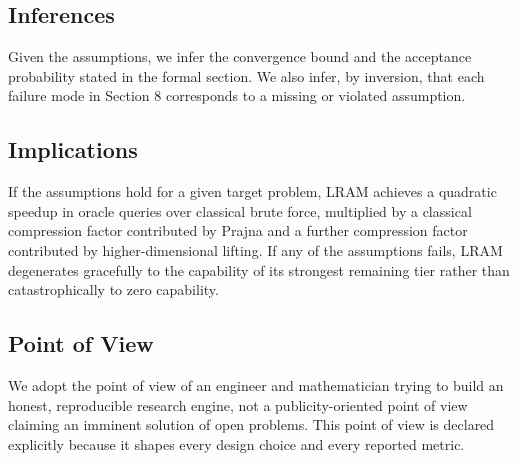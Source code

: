 \subsection{Inferences}
Given the assumptions, we infer the convergence bound and the acceptance probability stated in the formal section. We also infer, by inversion, that each failure mode in Section 8 corresponds to a missing or violated assumption.

\subsection{Implications}
If the assumptions hold for a given target problem, LRAM achieves a quadratic speedup in oracle queries over classical brute force, multiplied by a classical compression factor contributed by Prajna and a further compression factor contributed by higher-dimensional lifting. If any of the assumptions fails, LRAM degenerates gracefully to the capability of its strongest remaining tier rather than catastrophically to zero capability.

\subsection{Point of View}
We adopt the point of view of an engineer and mathematician trying to build an honest, reproducible research engine, not a publicity-oriented point of view claiming an imminent solution of open problems. This point of view is declared explicitly because it shapes every design choice and every reported metric.
